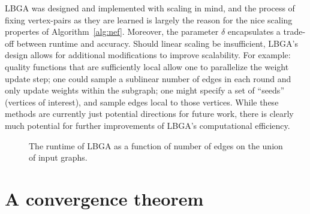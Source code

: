 \documentclass{article}
\begin{document}
LBGA was designed and implemented with scaling in mind, and the process of
fixing vertex-pairs as they are learned is largely the reason for the nice
scaling propertes of Algorithm~\ref{alg:nef}. Moreover, the parameter $\delta$
encapsulates a trade-off between runtime and accuracy. Should linear scaling be
insufficient, LBGA's design allows for additional modifications to improve
scalability.  For example: quality functions that are sufficiently local allow
one to parallelize the weight update step; one could sample a sublinear number
of edges in each round and only update weights within the subgraph; one might
specify a set of ``seeds'' (vertices of interest), and sample edges local to
those vertices. While these methods are currently just potential directions for
future work, there is clearly much potential for further improvements of LBGA's
computational efficiency.

\begin{figure}[bht]
\begin{centering}
\par\end{centering}
\caption{The runtime of LBGA as a function of number of edges on the union of input graphs.} 
\label{fig:scalability-analysis}
\end{figure}

\section{A convergence theorem}
\label{sec:convergence-theorem}
\end{document}
